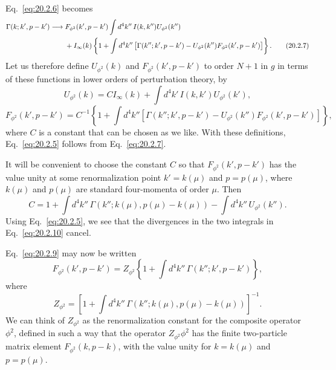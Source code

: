 Eq.~\eqref{eq:20.2.6} becomes
\begin{align}
 \Gamma(k;k',p-k')\longrightarrow{}&
 F_{\phi^2}(k',p-k')
 \int d^4k''\,I(k,k'')U_{\phi^2}(k'')
 \notag\\
 &+I_\infty(k)
 \left\{1+\int d^4k''
 \left[\Gamma(k'';k',p-k')
 -U_{\phi^2}(k'')F_{\phi^2}(k',p-k')\right]\right\}.
 \tag{20.2.7}\label{eq:20.2.7}
\end{align}
Let us therefore define $U_{\phi^2}(k)$ and $F_{\phi^2}(k',p-k')$ to order
$N+1$ in $g$ in terms of these functions in lower orders of perturbation
theory, by
\begin{equation}
 U_{\phi^2}(k)=CI_\infty(k)
 +\int d^4k'\,I(k,k')U_{\phi^2}(k'),
 \tag{20.2.8}\label{eq:20.2.8}
\end{equation}
\begin{equation}
 F_{\phi^2}(k',p-k')=C^{-1}
 \left\{1+\int d^4k''
 \left[\Gamma(k'';k',p-k')
 -U_{\phi^2}(k'')F_{\phi^2}(k',p-k')\right]\right\},
 \tag{20.2.9}\label{eq:20.2.9}
\end{equation}
where $C$ is a constant that can be chosen as we like. With these definitions,
Eq.~\eqref{eq:20.2.5} follows from Eq.~\eqref{eq:20.2.7}.

It will be convenient to choose the constant $C$ so that
$F_{\phi^2}(k',p-k')$ has the value unity at some renormalization point
$k'=k(\mu)$ and $p=p(\mu)$, where $k(\mu)$ and $p(\mu)$ are standard
four-momenta of order $\mu$. Then
\begin{equation}
 C=1+\int d^4k''\,\Gamma(k'';k(\mu),p(\mu)-k(\mu))
 -\int d^4k''\,U_{\phi^2}(k'').
 \tag{20.2.10}\label{eq:20.2.10}
\end{equation}
Using Eq.~\eqref{eq:20.2.5}, we see that the divergences in the two integrals
in Eq.~\eqref{eq:20.2.10} cancel.

Eq.~\eqref{eq:20.2.9} may now be written
\begin{equation}
 F_{\phi^2}(k',p-k')=
 Z_{\phi^2}\left\{1+\int d^4k''\,\Gamma(k'';k',p-k')\right\},
 \tag{20.2.11}\label{eq:20.2.11}
\end{equation}
where
\begin{equation}
 Z_{\phi^2}=
 \left[1+\int d^4k''\,
 \Gamma(k'';k(\mu),p(\mu)-k(\mu))\right]^{-1}.
 \tag{20.2.12}\label{eq:20.2.12}
\end{equation}
We can think of $Z_{\phi^2}$ as the renormalization constant for the
composite operator $\phi^2$, defined in such a way that the operator
$Z_{\phi^2}\phi^2$ has the finite two-particle matrix element
$F_{\phi^2}(k,p-k)$, with the value unity for $k=k(\mu)$ and $p=p(\mu)$.

